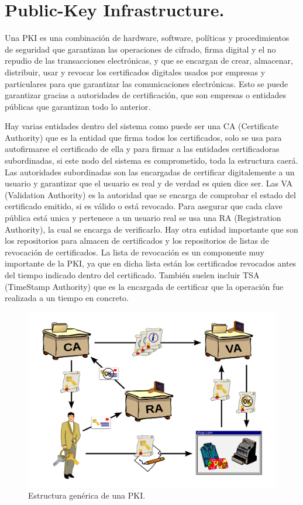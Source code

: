 \section{Public-Key Infrastructure.}

Una PKI es una combinación de hardware, software, políticas y procedimientos de seguridad que garantizan las operaciones de cifrado, firma digital y el no repudio de las transacciones electrónicas, y que se encargan de crear, almacenar, distribuir, usar y revocar los certificados digitales usados por empresas y particulares para que garantizar las comunicaciones electrónicas. Esto se puede garantizar gracias a autoridades de certificación, que son empresas o entidades públicas que garantizan todo lo anterior.

Hay varias entidades dentro del sistema como puede ser una CA (Certificate Authority) que es la entidad que firma todos los certificados, solo se usa para autofirmarse el certificado de ella y para firmar a las entidades certificadoras subordinadas, si este nodo del sistema es comprometido, toda la estructura caerá. Las autoridades subordinadas son las encargadas de certificar digitalemente a un usuario y garantizar que el usuario es real y de verdad es quien dice ser.  Las VA (Validation Authority) es la autoridad que se encarga de comprobar el estado del certificado emitido, si es válido o está revocado. Para asegurar que cada clave pública está unica y pertenece a un usuario real se usa una RA (Registration Authority), la cual se encarga de verificarlo. Hay otra entidad importante que son los repositorios para almacen de certificados y los repositorios de listas de revocación de certificados. La lista de revocación es un componente muy importante de la PKI, ya que en dicha lista están los certificados revocados antes del tiempo indicado dentro del certificado. También suelen incluir TSA (TimeStamp Authority) que es la encargada de certificar que la operación fue realizada a un tiempo en concreto.


\begin{figure}
  \centering
    \includegraphics[scale=0.5]{./Criptografia/imagenes/esquemaPKI.png}
  \caption{Estructura genérica de una PKI.}
  \label{fig:esquemaPKI}
\end{figure} 


